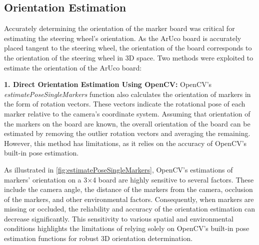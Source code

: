 \subsection{Orientation Estimation}
Accurately determining the orientation of the marker board was 
critical for estimating the steering wheel’s orientation. 
As the ArUco board is accurately placed tangent to the steering 
wheel, the orientation of the board corresponds to the 
orientation of the steering wheel in 3D space. 
Two methods were exploited to estimate the orientation of 
the ArUco board: 

\textbf{1. Direct Orientation Estimation Using OpenCV: }
OpenCV’s \emph{estimatePoseSingleMarkers} function also calculates the 
orientation of markers in the form of rotation vectors. 
These vectors indicate the rotational pose of each marker 
relative to the camera’s coordinate system. Assuming that orientation of the markers on the board are known, the overall orientation of the board
can be estimated by removing the outlier rotation vectors and averaging the remaining. However, this method has limitations, as it relies on the 
accuracy of OpenCV's built-in pose estimation.

As illustrated in \cref{fig:estimatePoseSingleMarkers}, 
OpenCV's estimations of markers' orientation on a 3×4 board are highly sensitive to several factors. 
These include the camera angle, the distance of the markers from 
the camera, occlusion of the markers, and other environmental 
factors. Consequently, when markers are missing or occluded, 
the reliability and accuracy of the orientation estimation can 
decrease significantly. This sensitivity to various spatial and 
environmental conditions highlights the limitations of relying 
solely on OpenCV's built-in pose estimation functions for robust 
3D orientation determination.

